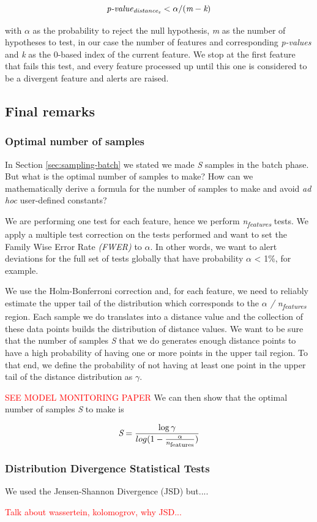 \[  \textit{p-value\textsubscript{distance\textsubscript{x}}} < \alpha / (\textit{m} - \textit{k}) \]

with $\alpha$ as the probability to reject the null hypothesis, \textit{m} as the number of hypotheses to test, in our case the number of features and corresponding \textit{p-values} and \textit{k} as the 0-based index of the current feature. We stop at the first feature that fails this test, and every feature processed up until this one is considered to be a divergent feature and alerts are raised.

\subsection{Final remarks}

\subsubsection*{Optimal number of samples}
In Section \ref{sec:sampling-batch} we stated we made \textit{S} samples in the batch phase. But what is the optimal number of samples to make? How can we mathematically derive a formula for the number of samples to make and avoid \textit{ad hoc} user-defined constants?

We are performing one test for each feature, hence we perform \textit{n\textsubscript{features}} tests. We apply a multiple test correction on the tests performed and want to set the Family Wise Error Rate \textit{(FWER)} to $\alpha$. In other words, we want to alert deviations for the full set of tests globally that have probability $\alpha$ < 1\%, for example.

We use the Holm-Bonferroni correction and, for each feature, we need to reliably estimate the upper tail of the distribution which corresponds to the \textit{$\alpha$ / n\textsubscript{features}} region. Each sample we do translates into a distance value and the collection of these data points builds the distribution of distance values. We want to be sure that the number of samples \textit{S} that we do generates enough distance points to have a high probability of having one or more points in the upper tail region. To that end, we define the probability of not having at least one point in the upper tail of the distance distribution as $\gamma$. 

\textcolor{red}{SEE MODEL MONITORING PAPER} We can then show that the optimal number of samples \textit{S} to make is

\begin{equation}
    \label{eq:optimal-n-samples}
    \textit{S} = \frac{\log\gamma}{log(1 - \frac{\alpha}{n\textsubscript{features}})}
\end{equation}

\subsubsection*{Distribution Divergence Statistical Tests} \label{sec:whyjsds}

We used the Jensen-Shannon Divergence (JSD) but....

\textcolor{red}{Talk about wassertein, kolomogrov, why JSD...}
